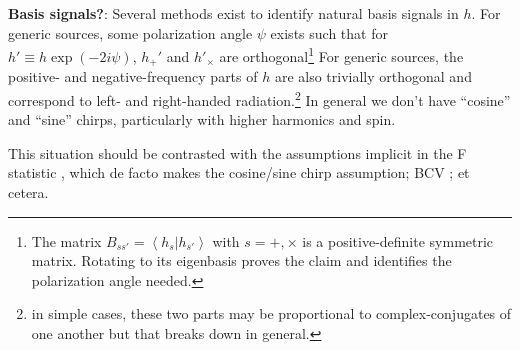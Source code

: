 \documentclass[twocolumn,prd,nofootinbib]{revtex4}
\newcommand\qmstateproduct[2]{\left\langle#1|#2\right\rangle}
\begin{document}
\begin{shaded}
\noindent \textbf{Basis signals?}: Several methods exist to identify natural basis signals in
$h$.  For generic sources, some polarization angle $\psi$ exists such that for $h'\equiv h \exp(-2i\psi)$,
$h_+'$ and  $h'_\times$ are  orthogonal\footnote{%
The matrix $B_{ss'} =\qmstateproduct{h_s}{h_{s'}}$ with $s=+,\times$ is a positive-definite symmetric matrix.  Rotating
to its eigenbasis proves the claim and identifies the polarization angle needed.}
For generic sources,  the positive- and negative-frequency parts of $h$ are also trivially orthogonal and  correspond to left- and
right-handed radiation.\footnote{ in simple cases,  these two parts may be proportional to complex-conjugates of one
another but that breaks down in general.  }
In general we don't have ``cosine'' and ``sine'' chirps, particularly with higher harmonics and spin.

This situation should be contrasted with the assumptions implicit in the F statistic
\cite{gwastro-HarryFairhurst-CoherentTargetedSearch}, which de facto makes the cosine/sine chirp assumption; BCV
\cite{BCV:PTF}; et cetera. 
\end{shaded}
\end{document}
